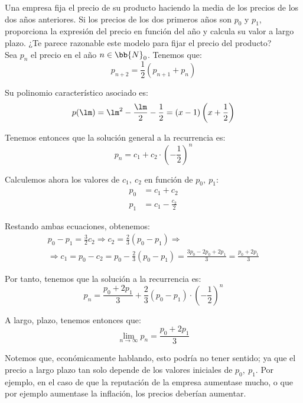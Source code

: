 \begin{ejercicio}
    Una empresa fija el precio de su producto haciendo la media de los precios de los dos años anteriores. Si los precios
    de los dos primeros años son $p_0$ y $p_1$, proporciona la expresión del precio en función del año y calcula su valor a
    largo plazo. ¿Te parece razonable este modelo para fijar el precio del producto?\\

    Sea $p_n$ el precio en el año $n\in \bb{N}_0$. Tenemos que:
    \begin{equation*}
        p_{n+2} = \frac{1}{2}\left(p_{n+1} + p_{n}\right)
    \end{equation*}

    Su polinomio característico asociado es:
    \begin{equation*}
        p(\lm) = \lm^2-\frac{\lm}{2} - \frac{1}{2}
        = \left(x-1\right)\left(x+\frac{1}{2}\right)
    \end{equation*}

    Tenemos entonces que la solución general a la recurrencia es:
    \begin{equation*}
        p_n = c_1 + c_2\cdot \left(-\frac{1}{2}\right)^n
    \end{equation*}

    Calculemos ahora los valores de $c_1,~c_2$ en función de $p_0,~p_1$:
    \begin{align*}
        p_0 &= c_1+c_2\\
        p_1 &= c_1-\frac{c_2}{2}
    \end{align*}

    Restando ambas ecuaciones, obtenemos:
    \begin{multline*}
        p_0-p_1 = \frac{3}{2}c_2 \Longrightarrow c_2 = \frac{2}{3}\left(p_0-p_1\right)
        \Longrightarrow\\\Longrightarrow
        c_1 = p_0-c_2 = p_0-\frac{2}{3}\left(p_0-p_1\right)
        = \frac{3p_0-2p_0+2p_1}{3} = \frac{p_0+2p_1}{3}
    \end{multline*}

    Por tanto, tenemos que la solución a la recurrencia es:
    \begin{equation*}
        p_n = \frac{p_0+2p_1}{3} + \frac{2}{3}\left(p_0-p_1\right)\cdot \left(-\frac{1}{2}\right)^n
    \end{equation*}

    A largo, plazo, tenemos entonces que:
    \begin{equation*}
        \lim_{n\to \infty} p_n = \frac{p_0+2p_1}{3}
    \end{equation*}

    Notemos que, económicamente hablando, esto podría no tener sentido; ya que el precio a largo plazo tan solo depende de los valores iniciales de $p_0,~p_1$. Por ejemplo, en el caso de que la reputación de la empresa aumentase mucho, o que por ejemplo aumentase la inflación, los precios deberían aumentar.
\end{ejercicio}

